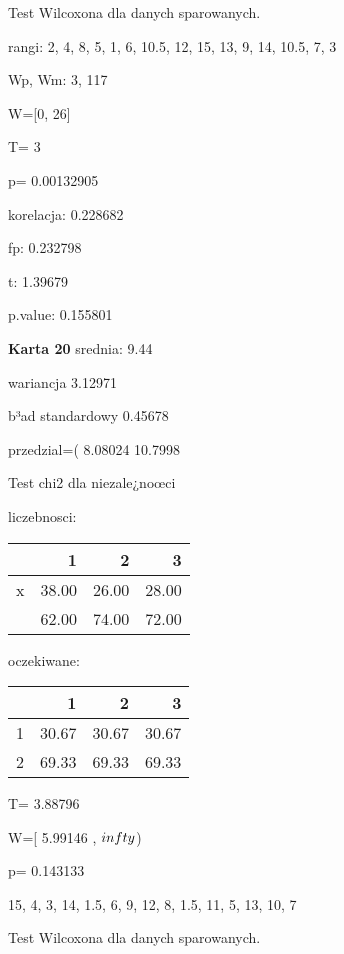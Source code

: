 \documentclass[a4paper,12pt]{article}
\begin{document}
\begin{multicols}{3}
  Test Wilcoxona dla danych sparowanych. 
  
  rangi: 2, 4, 8, 5, 1, 6, 10.5, 12, 15, 13, 9, 14, 10.5, 7, 3 
  
  Wp, Wm:  3,  117 
  
  W=[0, 26]  
  
  T=  3 
  
  p= 0.00132905 \vspace{1cm} 

  korelacja: 0.228682
     
     fp: 0.232798
     
     t: 1.39679
     
     p.value: 0.155801 \vspace{1cm} 

  \textbf{Karta  20 } 
 srednia: 9.44 
     
     wariancja 3.12971  
     
     b³ad standardowy 0.45678 
     
     przedzial=( 8.08024 10.7998 \vspace{1cm} 

  Test chi2 dla niezale¿noœci 
   
   liczebnosci: %
\begin{tabular}{rrrr}
  \hline
 & 1 & 2 & 3 \\
  \hline
x & 38.00 & 26.00 & 28.00 \\
   & 62.00 & 74.00 & 72.00 \\
   \hline
\end{tabular}
 
   
   oczekiwane: %
\begin{tabular}{rrrr}
  \hline
 & 1 & 2 & 3 \\
  \hline
1 & 30.67 & 30.67 & 30.67 \\
  2 & 69.33 & 69.33 & 69.33 \\
   \hline
\end{tabular}
 
   
   T= 3.88796 
   
   W=[ 5.99146 , $\\infty$) 
   
   p= 0.143133 \vspace{1cm} 

  15, 4, 3, 14, 1.5, 6, 9, 12, 8, 1.5, 11, 5, 13, 10, 7 

  Test Wilcoxona dla danych sparowanych. 
  

\end{multicols}
\end{document}
